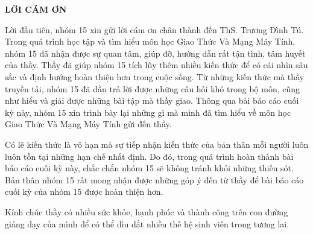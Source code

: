 \documentclass[12pt, a4paper]{article}
\begin{document}
	\newpage
	\begin{center}
		\textbf{\Large LỜI CÁM ƠN}\\ [15pt]
	\end{center}
	\par
	\large
	\hspace{0.75cm}Lời đầu tiên, nhóm 15 xin gửi lời cám ơn chân thành đến ThS. Trương Đình Tú. Trong quá trình học tập và tìm hiểu môn học Giao Thức Và Mạng Máy Tính, nhóm 15 đã nhận được sự quan tâm, giúp đỡ, hướng dẫn rất tận tình, tâm huyết của thầy. Thầy đã giúp nhóm 15 tích lũy thêm nhiều kiến thức để có cái nhìn sâu sắc và định hướng hoàn thiện hơn trong cuộc sống. Từ những kiến thức mà thầy truyền tải, nhóm 15 đã dần trả lời được những câu hỏi khó trong bộ môn, cũng như hiểu và giải được những bài tập mà thầy giao. Thông qua bài báo cáo cuối kỳ này, nhóm 15 xin trình bày lại những gì mà mình đã tìm hiểu về môn học Giao Thức Và Mạng Máy Tính gửi đến thầy. \par
	\hspace{0.75cm}Có lẽ kiến thức là vô hạn mà sự tiếp nhận kiến thức của bản thân mỗi người luôn luôn tồn tại những hạn chế nhất định. Do đó, trong quá trình hoàn thành bài báo cáo cuối kỳ này, chắc chắn nhóm 15 sẽ không tránh khỏi những thiếu sót. Bản thân nhóm 15 rất mong nhận được những góp ý đến từ thầy để bài báo cáo cuối kỳ của nhóm 15 được hoàn thiện hơn.\par
	\hspace{0.75cm}Kính chúc thầy có nhiều sức khỏe, hạnh phúc và thành công trên con đường giảng dạy của mình để có thể dìu dắt nhiều thế hệ sinh viên trong tương lai.\par
\end{document}
